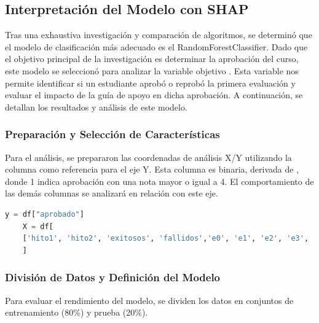 \subsection{Interpretación del Modelo con SHAP}

Tras una exhaustiva investigación y comparación de algoritmos, se determinó que el modelo de clasificación más adecuado es el RandomForestClassifier. Dado que el objetivo principal de la investigación es determinar la aprobación del curso, este modelo se seleccionó para analizar la variable objetivo . Esta variable nos permite identificar si un estudiante aprobó o reprobó la primera evaluación y evaluar el impacto de la guía de apoyo en dicha aprobación. A continuación, se detallan los resultados y análisis de este modelo.

\subsubsection{Preparación y Selección de Características}

Para el análisis, se prepararon las coordenadas de análisis X/Y utilizando la columna  como referencia para el eje Y. Esta columna es binaria, derivada de , donde 1 indica aprobación con una nota mayor o igual a 4. El comportamiento de las demás columnas se analizará en relación con este eje.


\begin{lstlisting}[language=Python, caption=Selección de características y variable objetivo para RandomForestClassifier, label=lst:seleccion_caracteristicasRFC]
    y = df["aprobado"]
    X = df[
    ['hito1', 'hito2', 'exitosos', 'fallidos','e0', 'e1', 'e2', 'e3', 'e4', 'e5', 'e6', 'e7', 'e8', 'e9', 'e10', 'e11', 'e12', 'e13', 'e14', 'e15', 'e16', 'e17', 'e18', 'e19', 'e20', 'e21', 'e22', 'e23', 'e24', 'e25', 'e26', 'e27', 'e28', 'e29', 'e30', 'e31', 'e32', 'e33', 'e34', 'e35', 'e36', 'e37', 'e38', 'e39', 'e40', 'e41', 'e42', 'e43', 'e44', 'e45', 'e46', 'e47', 'e48', 'e49', 'e50', 'e51', 'e52']
    ]
    \end{lstlisting}

\subsubsection{División de Datos y Definición del Modelo}

Para evaluar el rendimiento del modelo, se dividen los datos en conjuntos de entrenamiento (80\%) y prueba (20\%).

